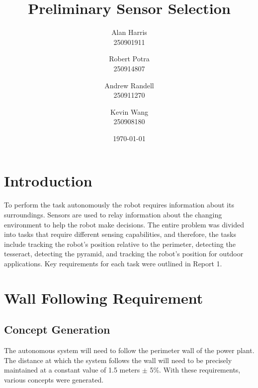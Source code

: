\documentclass[12pt]{article}
\begin{document}
\title{\textbf{Preliminary Sensor Selection}}
\author{
  Alan Harris\\
  250901911
  \and
  Robert Potra\\
  250914807
  \and
  Andrew Randell\\
  250911270
  \and
  Kevin Wang\\
  250908180
}
\date{\today}
\maketitle

\setcounter{page}{1}

\vspace*{-\baselineskip}

\section{Introduction}

To perform the task autonomously the robot requires information about its surroundings. Sensors are used to relay information about the changing environment to help the robot make decisions. The entire problem was divided into tasks that require different sensing capabilities, and therefore, the tasks include tracking the robot's position relative to the perimeter, detecting the tesseract, detecting the pyramid, and tracking the robot's position for outdoor applications. Key requirements for each task were outlined in Report 1.

\section{Wall Following Requirement}
\subsection{Concept Generation}

The autonomous system will need to follow the perimeter wall of the power plant. The distance at which the system follows the wall will need to be precisely maintained at a constant value of 1.5 meters $\pm$ 5\%. With these requirements, various concepts were generated.
\end{document}
